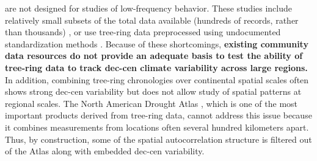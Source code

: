 \documentclass[phd,tocprelim]{cornell}
\begin{document}
are not designed for studies of low-frequency behavior. These studies 
include relatively small subsets of the total data available 
(hundreds of records, rather than thousands) \cite{briffa2002tree}, 
or use tree-ring data preprocessed using undocumented 
standardization methods \cite{wahl2012comparative}. Because of 
these shortcomings, \textbf{existing community data resources do not 
provide an adequate basis to test the ability of tree-ring data to 
track dec-cen climate variability across large regions.} In addition, 
combining tree-ring chronologies over continental spatial scales 
often shows strong dec-cen variability \cite{cook2004climate} but 
does not allow study of spatial patterns at regional scales.
The North American Drought Atlas \cite{cook2004climate}, which is 
one of the most important products derived from tree-ring data, cannot 
address this issue because it combines measurements from locations 
often several hundred kilometers apart. Thus, by construction, some 
of the spatial autocorrelation structure is filtered out of the Atlas 
along with embedded dec-cen variability.
\end{document}
